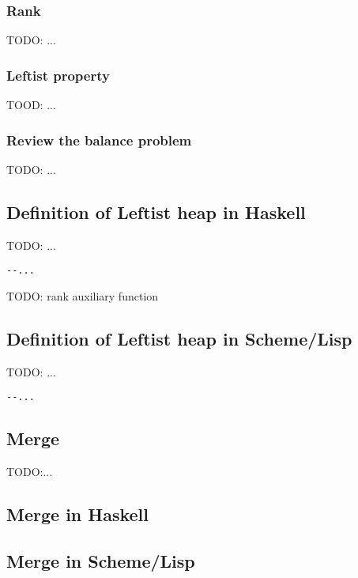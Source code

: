 \documentclass{article}
\begin{document}
\subsubsection{Rank}

TODO: ...

\subsubsection{Leftist property}

TOOD: ...

\subsubsection{Review the balance problem}

TODO: ...

\subsection*{Definition of Leftist heap in Haskell}

TODO: ...

\lstset{language=Haskell}
\begin{lstlisting}
--...
\end{lstlisting}

TODO: rank auxiliary function

\subsection*{Definition of Leftist heap in Scheme/Lisp}

TODO: ...

\lstset{language=lisp}
\begin{lstlisting}
--...
\end{lstlisting}

\subsection{Merge}

TODO:...

\subsection*{Merge in Haskell}

\subsection*{Merge in Scheme/Lisp}
\end{document}
